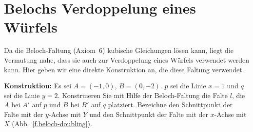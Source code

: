 \section{Belochs Verdoppelung eines Würfels}\label{s.cube2}



Da die Beloch-Faltung (Axiom~6) kubische Gleichungen lösen kann, liegt die Vermutung nahe, dass sie auch zur Verdoppelung eines Würfels verwendet werden kann. Hier geben wir eine direkte Konstruktion an, die diese Faltung verwendet.

\noindent\textbf{Konstruktion:}
Es sei $A=(-1,0)$, $B=(0,-2)$. $p$ sei die Linie $x=1$ und $q$ sei die Linie $y=2$. Konstruieren Sie mit Hilfe der Beloch-Faltung die Falte $l$, die $A$ bei $A'$ auf $p$ und $B$ bei $B'$ auf $q$ platziert. Bezeichne den Schnittpunkt der Falte mit der $y$-Achse mit $Y$ und den Schnittpunkt der Falte mit der $x$-Achse mit $X$ (Abb.~\ref{f.beloch-doubling}).

